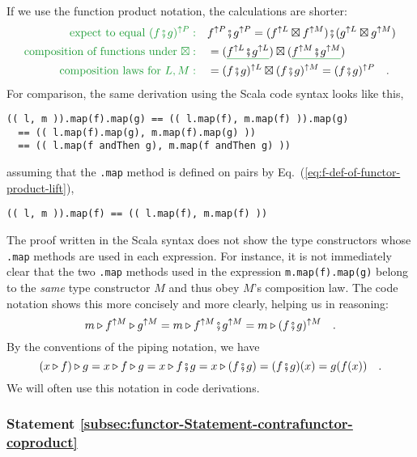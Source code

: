 If we use the function product notation, the calculations are shorter:
\begin{align*}
{\color{greenunder}\text{expect to equal }(f\bef g)^{\uparrow P}:}\quad & f^{\uparrow P}\bef g^{\uparrow P}=(f^{\uparrow L}\boxtimes f^{\uparrow M})\bef(g^{\uparrow L}\boxtimes g^{\uparrow M})\\
{\color{greenunder}\text{composition of functions under }\boxtimes:}\quad & =(\gunderline{f^{\uparrow L}\bef g^{\uparrow L}})\boxtimes(\gunderline{f^{\uparrow M}\bef g^{\uparrow M}})\\
{\color{greenunder}\text{composition laws for }L,M:}\quad & =(f\bef g)^{\uparrow L}\boxtimes(f\bef g)^{\uparrow M}=(f\bef g)^{\uparrow P}\quad.
\end{align*}
For comparison, the same derivation using the Scala code syntax looks
like this,
\begin{lstlisting}
(( l, m )).map(f).map(g) == (( l.map(f), m.map(f) )).map(g)
  == (( l.map(f).map(g), m.map(f).map(g) ))
  == (( l.map(f andThen g), m.map(f andThen g) )) 
\end{lstlisting}
assuming that the \lstinline!.map! method is defined on pairs by
Eq.~(\ref{eq:f-def-of-functor-product-lift}),
\begin{lstlisting}
(( l, m )).map(f) == (( l.map(f), m.map(f) ))
\end{lstlisting}
The proof written in the Scala syntax does not show the type constructors
whose \lstinline!.map! methods are used in each expression. For instance,
it is not immediately clear that the two \lstinline!.map! methods
used in the expression \lstinline!m.map(f).map(g)! belong to the
\emph{same} type constructor $M$ and thus obey $M$'s composition
law. The code notation shows this more concisely and more clearly,
helping us in reasoning:
\[
m\triangleright f^{\uparrow M}\triangleright g^{\uparrow M}=m\triangleright f^{\uparrow M}\bef g^{\uparrow M}=m\triangleright(f\bef g)^{\uparrow M}\quad.
\]
By the conventions of the piping notation, we have
\[
\left(x\triangleright f\right)\triangleright g=x\triangleright f\triangleright g=x\triangleright f\bef g=x\triangleright(f\bef g)=(f\bef g)(x)=g(f(x))\quad.
\]
We will often use this notation in code derivations.

\subsubsection{Statement \label{subsec:functor-Statement-contrafunctor-coproduct}\ref{subsec:functor-Statement-contrafunctor-coproduct}}

